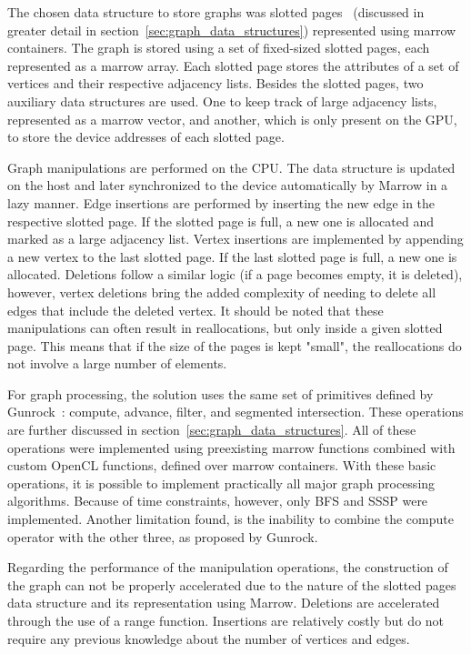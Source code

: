     The chosen data structure to store graphs was slotted pages~\cite{paper:turbograph} (discussed in greater detail in section~\ref{sec:graph_data_structures}) represented using marrow containers. 
    The graph is stored using a set of fixed-sized slotted pages, each represented as a marrow array. Each slotted page stores the attributes of a set of vertices and their respective adjacency lists. Besides the slotted pages, two auxiliary data structures are used. One to keep track of large adjacency lists, represented as a marrow vector, and another, which is only present on the \gls{GPU}, to store the device addresses of each slotted page.
    
    Graph manipulations are performed on the \gls{CPU}. The data structure is updated on the host and later synchronized to the device automatically by Marrow in a lazy manner. Edge insertions are performed by inserting the new edge in the respective slotted page. If the slotted page is full, a new one is allocated and marked as a large adjacency list. Vertex insertions are implemented by appending a new vertex to the last slotted page. If the last slotted page is full, a new one is allocated. Deletions follow a similar logic (if a page becomes empty, it is deleted), however, vertex deletions bring the added complexity of needing to delete all edges that include the deleted vertex. It should be noted that these manipulations can often result in reallocations, but only inside a given slotted page. This means that if the size of the pages is kept "small", the reallocations do not involve a large number of elements.
    
    For graph processing, the solution uses the same set of primitives defined by Gunrock~\cite{paper:gunrock}: compute, advance, filter, and segmented intersection. These operations are further discussed in section~\ref{sec:graph_data_structures}. All of these operations were implemented using preexisting marrow functions combined with custom OpenCL functions, defined over marrow containers. With these basic operations, it is possible to implement practically all major graph processing algorithms. Because of time constraints, however, only \gls{BFS} and \gls{SSSP} were implemented. Another limitation found, is the inability to combine the compute operator with the other three, as proposed by Gunrock.

    Regarding the performance of the manipulation operations, the construction of the graph can not be properly accelerated due to the nature of the slotted pages data structure and its representation using Marrow. Deletions are accelerated through the use of a range function. Insertions are relatively costly but do not require any previous knowledge about the number of vertices and edges.

